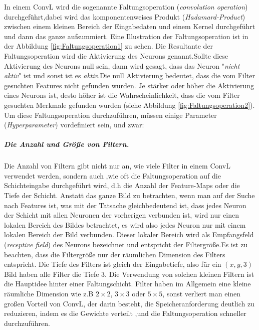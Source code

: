 \documentclass[12pt,a4paper]{scrartcl}
\numberwithin{equation}{section}
\begin{document}
In einem \ac{ConvL} wird die sogenannte Faltungsoperation (\emph{convolution operation}) durchgeführt,dabei wird das komponentenweises Produkt (\textit{Hadamard-Product}) zwischen einem kleinen Bereich der Eingabedaten und einem Kernel durchgeführt und dann das ganze aufsummiert. Eine Illustration der Faltungsoperation ist in der Abbildung  \ref{fig:Faltungsoperation1} zu sehen. Die Resultante der Faltungsoperation wird die Aktivierung des Neurons genannt.Sollte diese Aktivierung des Neurons null sein, dann wird gesagt, dass das Neuron "\textit{nicht aktiv}"{} ist und sonst ist es \textit{aktiv}.Die null Aktivierung bedeutet, dass die vom Filter gesuchten Features nicht gefunden wurden. Je stärker oder höher die Aktivierung eines Neurons ist, desto höher ist die Wahrscheinlichkeit, dass die vom Filter gesuchten Merkmale gefunden wurden (siehe Abbildung \ref{fig:Faltungsoperation2}). Um diese Faltungsoperation durchzuführen, müssen einige Parameter (\textit{Hyperparameter}) vordefiniert sein, und zwar:

\subparagraph{Die Anzahl und Größe von Filtern.}
	Die Anzahl von Filtern gibt nicht nur an, wie viele Filter in einem \ac{ConvL} verwendet werden, sondern auch ,wie oft die Faltungsoperation auf die Schichteingabe durchgeführt wird, d.h die Anzahl der Feature-Maps oder die Tiefe der Schicht. Anstatt das ganze Bild zu betrachten, wenn man auf der Suche nach Features ist, was mit der Tatsache gleichbedeutend ist, dass jedes Neuron der Schicht mit allen Neuronen der vorherigen verbunden ist, wird nur einen lokalen Bereich des Bildes betrachtet, es wird also jedes Neuron nur mit einem lokalen Bereich der Bild verbunden. Dieser lokaler Bereich wird als Empfangsfeld (\emph{receptive field}) des Neurons bezeichnet und entspricht der Filtergröße.Es ist zu beachten, dass die Filtergröße nur der räumlichen Dimension des Filters entspricht. Die Tiefe des Filters ist gleich der Eingabetiefe, also für ein $ (x, y, 3) $ Bild haben alle Filter die Tiefe $ 3 $.	Die Verwendung von solchen kleinen Filtern ist die Hauptidee hinter einer Faltungschicht. Filter haben im Allgemein eine kleine räumliche Dimension wie z.B $ 2\times 2 $, $3 \times3 $  oder  $5 \times 5$, sonst verliert man einen großen Vorteil von \ac{ConvL}, der darin besteht, die Speicheranforderung deutlich zu reduzieren, indem es die Gewichte verteilt ,und die Faltungsoperation schneller durchzuführen. 
	
\end{document}
